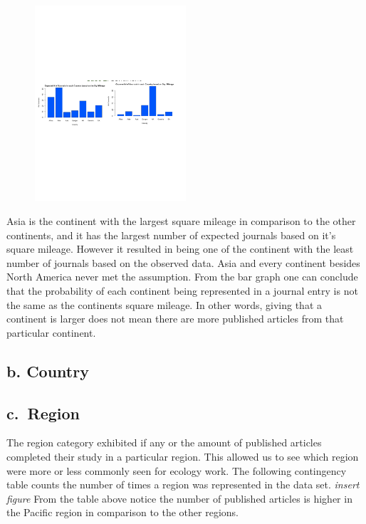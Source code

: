 \documentclass[
]{article}
\begin{document}
\begin{figure}
    \centering
    \includegraphics[width=0.50\textwidth]{Continent2BarGraph.pdf}
    \label{fig:Continent Bar Graph}
\end{figure}

Asia is the continent with the largest square mileage in comparison to
the other continents, and it has the largest number of expected journals
based on it's square mileage. However it resulted in being one of the
continent with the least number of journals based on the observed data.
Asia and every continent besides North America never met the assumption.
From the bar graph one can conclude that the probability of each
continent being represented in a journal entry is not the same as the
continents square mileage. In other words, giving that a continent is
larger does not mean there are more published articles from that
particular continent.

\hypertarget{b.-country}{%
\subsection{b. Country}\label{b.-country}}

\hypertarget{c.-region}{%
\subsection{c.~Region}\label{c.-region}}

The region category exhibited if any or the amount of published articles
completed their study in a particular region. This allowed us to see
which region were more or less commonly seen for ecology work. The
following contingency table counts the number of times a region was
represented in the data set. \emph{insert figure} From the table above
notice the number of published articles is higher in the Pacific region
in comparison to the other regions.
\end{document}
